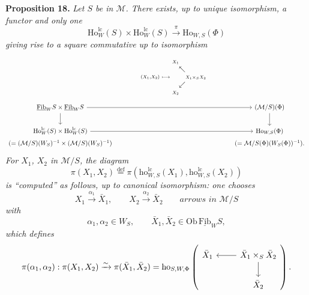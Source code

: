 \documentclass[11pt]{article}
\newcommand{\Fibu}{\underline{\mathrm{Fib}}}
\newcommand{\Ho}{\mathrm{Ho}}
\newcommand{\ho}{\mathrm{ho}}
\newcommand{\lc}{\mathrm{lc}}
\begin{document}
\textbf{Proposition 18.} \textit{Let $S$ be in $\mathcal{M}$. There exists, up to unique isomorphism, a functor and only one}
\[
\Ho^{\lc}_W(S) \times \Ho^{\lc}_W(S) \xrightarrow{\pi} \Ho_{W,S}(\Phi)
\]
\textit{giving rise to a square commutative up to isomorphism}
\[
\begin{tikzcd}[ampersand replacement=\&, column sep=large]
 \& {\scriptstyle (X_1,X_2)\ \longmapsto\ \begin{array}{@{}c@{}c@{}c@{}} \scriptstyle X_1 & & \\ & \nwarrow & \\ & & \scriptstyle X_1 \times_S X_2 \\ & \swarrow & \\ \scriptstyle X_2 & & \end{array}} \& \\[-3ex]
\Fibu_W S \times \Fibu_W S \arrow[rr] \arrow[d] \& \& (\mathcal{M}/S)(\Phi) \arrow[d] \\
\Ho^{\lc}_W(S) \times \Ho^{\lc}_W(S) \arrow[rr] \& \& \Ho_{W,S}(\Phi) \\[-4ex]
(= (\mathcal{M}/S)(W_S)^{-1} \times (\mathcal{M}/S)(W_S)^{-1}) \& \& (= \mathcal{M}/S(\Phi)(W_S(\Phi))^{-1}).
\end{tikzcd}
\]
\textit{For $X_1$, $X_2$ in $\mathcal{M}/S$, the diagram}
\[
\pi(X_1, X_2) \overset{\text{def}}{=} \pi(\ho^{\lc}_{W,S}(X_1), \ho^{\lc}_{W,S}(X_2))
\]
\textit{is ``computed'' as follows, up to canonical isomorphism: one chooses}
\[
X_1 \xrightarrow{\alpha_1} \bar{X}_1, \qquad X_2 \xrightarrow{\alpha_2} \bar{X}_2 \qquad \textit{arrows in } \mathcal{M}/S
\]
\textit{with}
\[
\alpha_1, \alpha_2 \in W_S, \qquad \bar{X}_1, \bar{X}_2 \in \mathrm{Ob}\, \Fibu_W S,
\]
\textit{which defines}
\[
\pi(\alpha_1, \alpha_2) : \pi(X_1, X_2) \xrightarrow{\sim} \pi(\bar{X}_1, \bar{X}_2) = \ho_{S,W,\Phi}
\left(
\begin{tikzcd}[ampersand replacement=\&]
\bar{X}_1 \& \bar{X}_1 \times_S \bar{X}_2 \arrow[l] \arrow[d] \\
 \& \bar{X}_2
\end{tikzcd}
\right).
\]
\end{document}
